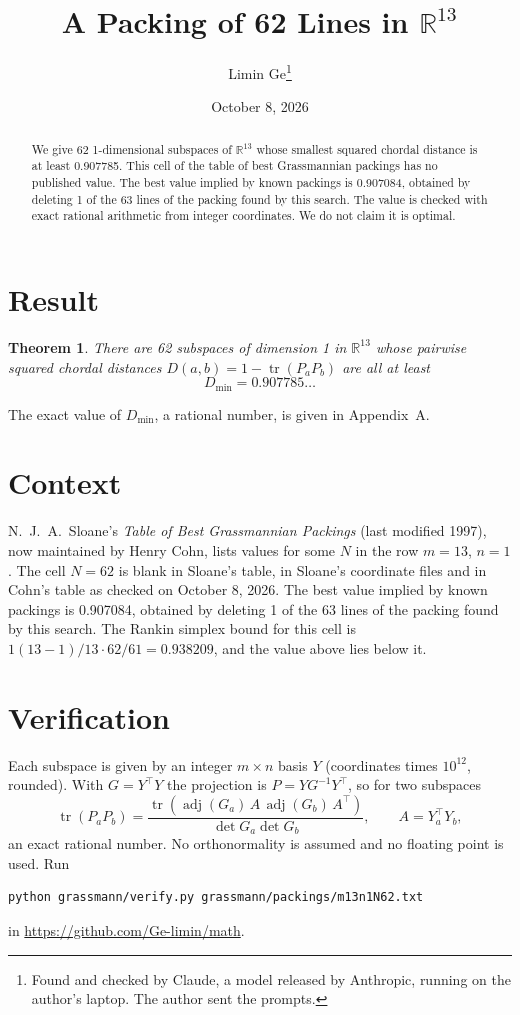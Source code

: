 \documentclass[11pt,a4paper]{article}
\title{A Packing of 62 Lines in $\mathbb{R}^{13}$}
\author{Limin Ge\thanks{Found and checked by Claude, a model released by Anthropic, running on the author's laptop. The author sent the prompts.}}
\date{October 8, 2026}
\newtheorem*{theorem}{Theorem}
\begin{document}
\maketitle
\begin{abstract}
We give 62 1-dimensional subspaces of $\mathbb{R}^{13}$ whose smallest squared chordal distance is at least 0.907785. This cell of the table of best Grassmannian packings has no published value. The best value implied by known packings is 0.907084, obtained by deleting 1 of the 63 lines of the packing found by this search. The value is checked with exact rational arithmetic from integer coordinates. We do not claim it is optimal.
\end{abstract}

\section{Result}
\begin{theorem}
There are 62 subspaces of dimension 1 in $\mathbb{R}^{13}$ whose pairwise squared chordal distances $D(a,b) = 1 - \operatorname{tr}(P_aP_b)$ are all at least
\[ D_{\min} = 0.907785\ldots \]
\end{theorem}
The exact value of $D_{\min}$, a rational number, is given in Appendix~A.


\section{Context}
N.~J.~A.~Sloane's \emph{Table of Best Grassmannian Packings} (last modified 1997), now maintained by Henry Cohn, lists values for some $N$ in the row $m=13$, $n=1$. The cell $N=62$ is blank in Sloane's table, in Sloane's coordinate files and in Cohn's table as checked on October 8, 2026. The best value implied by known packings is 0.907084, obtained by deleting 1 of the 63 lines of the packing found by this search. The Rankin simplex bound for this cell is $1(13-1)/13\cdot 62/61 = 0.938209$, and the value above lies below it.


\section{Verification}
Each subspace is given by an integer $m\times n$ basis $Y$ (coordinates times $10^{12}$, rounded). With $G=Y^\top Y$ the projection is $P=YG^{-1}Y^\top$, so for two subspaces
\[ \operatorname{tr}(P_aP_b)=\frac{\operatorname{tr}(\operatorname{adj}(G_a)\,A\,\operatorname{adj}(G_b)\,A^\top)}{\det G_a\det G_b},\qquad A=Y_a^\top Y_b, \]
an exact rational number. No orthonormality is assumed and no floating point is used. Run
\begin{verbatim}
python grassmann/verify.py grassmann/packings/m13n1N62.txt
\end{verbatim}
in \url{https://github.com/Ge-limin/math}.
\end{document}
